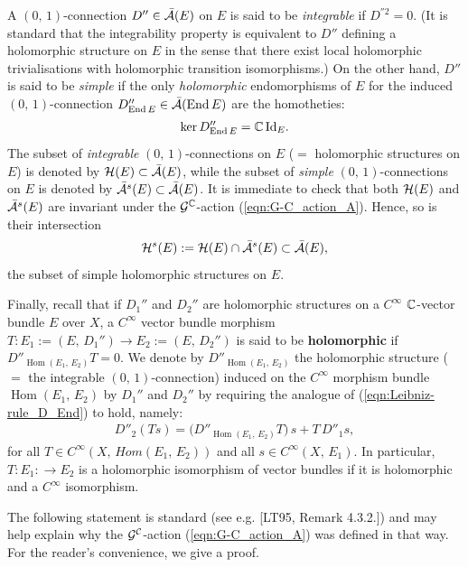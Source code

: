 \documentclass[12pt]{article}
\begin{document}
  A $(0,\,1)$-connection $D''\in\bar{\cal A}(E)$ on $E$ is said to be {\it integrable} if $D^{''2} = 0$. (It is standard that the integrability property is equivalent to $D''$ defining a holomorphic structure on $E$ in the sense that there exist local holomorphic trivialisations with holomorphic transition isomorphisms.) On the other hand, $D''$ is said to be {\it simple} if the only {\it holomorphic} endomorphisms of $E$ for the induced $(0,\,1)$-connection $D''_{\operatorname{End}E}\in\bar{\cal A}(\operatorname{End}E)$ are the homotheties: \begin{eqnarray*}\ker D''_{\operatorname{End}E} = \mathbb{C}\,\mbox{Id}_E.\end{eqnarray*} The subset of {\it integrable} $(0,\,1)$-connections on $E$ ($=$ holomorphic structures on $E$) is denoted by ${\cal H}(E)\subset\bar{\cal A}(E)$, while the subset of {\it simple} $(0,\,1)$-connections on $E$ is denoted by $\bar{\cal A}^s(E)\subset\bar{\cal A}(E)$. It is immediate to check that both ${\cal H}(E)$ and $\bar{\cal A}^s(E)$ are invariant under the ${\cal G}^{\mathbb{C}}$-action (\ref{eqn:G-C_action_A}). Hence, so is their intersection \begin{eqnarray*}{\cal H}^s(E):= {\cal H}(E)\cap\bar{\cal A}^s(E)\subset\bar{\cal A}(E),\end{eqnarray*} the subset of simple holomorphic structures on $E$.

  \vspace{1ex}

  Finally, recall that if $D_1''$ and $D_2''$ are holomorphic structures on a $C^\infty$ $\mathbb{C}$-vector bundle $E$ over $X$, a $C^\infty$ vector bundle morphism $T:E_1:=(E,\,D_1'')\longrightarrow E_2:=(E,\,D_2'')$ is said to be {\bf holomorphic} if $D''_{\operatorname{Hom} (E_1,\,E_2)}T =0$. We denote by $D''_{\operatorname{Hom} (E_1,\,E_2)}$ the holomorphic structure ($=$ the integrable $(0,\,1)$-connection) induced on the $C^\infty$ morphism bundle $\operatorname{Hom} (E_1,\,E_2)$ by $D_1''$ and $D_2''$ by requiring the analogue of (\ref{eqn:Leibniz-rule_D_End}) to hold, namely: \begin{eqnarray}\label{eqn:Leibniz-rule_D_Hom}D''_2 (Ts) = \bigg(D''_{\operatorname{Hom} (E_1,\,E_2)}T\bigg)\,s + T\,D''_1 s,\end{eqnarray} for all $T\in C^\infty(X,\,{Hom} (E_1,\,E_2))$ and all $s\in C^\infty(X,\,E_1)$. In particular, $T:E_1:\longrightarrow E_2$ is a holomorphic isomorphism of vector bundles if it is holomorphic and a $C^\infty$ isomorphism.

  The following statement is standard (see e.g. [LT95, Remark 4.3.2.]) and may help explain why the ${\cal G}^{\cal C}$-action (\ref{eqn:G-C_action_A}) was defined in that way. For the reader's convenience, we give a proof.
\end{document}
